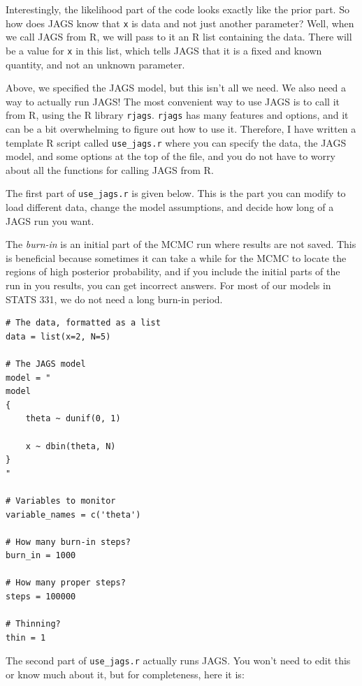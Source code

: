 Interestingly, the likelihood part of the code looks exactly like the
prior part. So how does JAGS know that {\tt x} is data and not just another
parameter? Well, when we call JAGS from R, we will pass to it an R list containing
the data. There will be a value for {\tt x} in this list, which tells JAGS that
it is a fixed and known quantity, and not an unknown parameter.

Above, we specified the JAGS model, but this isn't all we need. We also need
a way to actually run JAGS! The most
convenient way to use JAGS is to call it from R, using the R library
{\tt rjags}. {\tt rjags} has many features and options, and it can be a bit
overwhelming to figure out how to use it. Therefore, I have written a template
R script called {\tt use\_jags.r} where you can specify the data, the JAGS
model, and some options at the
top of the file, and you do not have to worry about all the functions for
calling JAGS from R.

The first part of {\tt use\_jags.r} is given below. This is the part you
can modify to load different data, change the model assumptions, and decide
how long of a JAGS run you want.

The {\it burn-in} is an initial part of the
MCMC run where results are not saved. This is beneficial because sometimes
it can take a while for the MCMC to locate the regions of high posterior
probability, and if you include the initial parts of the run in you results,
you can get incorrect answers. For most of our models in STATS 331, we do not
need a long burn-in period.

\begin{framed}
\begin{verbatim}
# The data, formatted as a list
data = list(x=2, N=5)

# The JAGS model
model = "
model
{
    theta ~ dunif(0, 1)

    x ~ dbin(theta, N)
}
"

# Variables to monitor
variable_names = c('theta')

# How many burn-in steps?
burn_in = 1000

# How many proper steps?
steps = 100000

# Thinning?
thin = 1
\end{verbatim}
\end{framed}

The second part of {\tt use\_jags.r} actually runs JAGS. You won't need to edit
this or know much about it, but for completeness, here it is:

